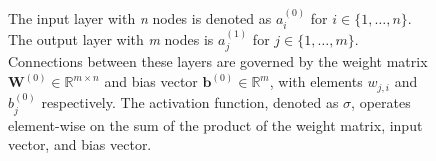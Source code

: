 \begin{figure}
{\begin{tikzpicture}[x=2.7cm,y=1.6cm]
\end{tikzpicture}
}
\caption[Activation function \cite{tikz}.]{\small{The input layer with \textit{n} nodes is denoted as $a_i^{(0)}$ for $i \in \{1, \ldots, n\}$. The output layer with \textit{m} nodes is $a_j^{(1)}$ for $j \in \{1, \ldots, m\}$. Connections between these layers are governed by the weight matrix $\mathbf{W}^{(0)} \in \mathbb{R}^{m\times n}$ and bias vector $\mathbf{b}^{(0)} \in \mathbb{R}^{m}$, with elements $w_{j,i}$ and $b_j^{(0)}$ respectively. The activation function, denoted as $\sigma$, operates element-wise on the sum of the product of the weight matrix, input vector, and bias vector.}}


    \label{fig:activation_function}

\end{figure}